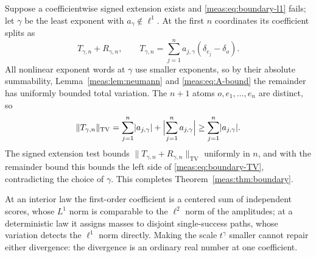 \documentclass[11pt]{article}
\numberwithin{equation}{section}
\theoremstyle{definition}
\theoremstyle{remark}
\newcommand{\TV}{\mathrm{TV}}
\newcommand{\norm}[1]{\lVert#1\rVert}
\newcommand{\abs}[1]{\lvert#1\rvert}
\begin{document}
Suppose a coefficientwise signed extension exists and \eqref{meas:eq:boundary-l1}
fails; let $\gamma$ be the least exponent with $a_\gamma\notin\ell^1$. At the first $n$
coordinates its coefficient splits as
\begin{equation}\label{meas:eq:boundary-first}
 T_{\gamma,n}+R_{\gamma,n},\qquad T_{\gamma,n}=\sum_{j=1}^na_{j,\gamma}(\delta_{e_j}-\delta_o).
\end{equation}
All nonlinear exponent words at $\gamma$ use smaller exponents, so by their absolute
summability, Lemma~\ref{meas:lem:neumann} and \eqref{meas:eq:A-bound} the
remainder has uniformly bounded total variation. The $n+1$ atoms
$o,e_1,\ldots,e_n$ are distinct, so
\begin{equation}\label{meas:eq:boundary-TV}
 \norm{T_{\gamma,n}}_\TV=\sum_{j=1}^n\abs{a_{j,\gamma}}+\Bigl\lvert\sum_{j=1}^na_{j,\gamma}\Bigr\rvert
 \ge\sum_{j=1}^n\abs{a_{j,\gamma}} .
\end{equation}
The signed extension test bounds $\norm{T_{\gamma,n}+R_{\gamma,n}}_\TV$ uniformly in $n$,
and with the remainder bound this bounds the left side of
\eqref{meas:eq:boundary-TV}, contradicting the choice of $\gamma$. This completes
Theorem~\ref{meas:thm:boundary}.

At an interior law the first-order coefficient is a centered sum of independent
scores, whose $L^1$ norm is comparable to the $\ell^2$ norm of the amplitudes; at a
deterministic law it assigns masses to disjoint single-success paths, whose
variation detects the $\ell^1$ norm directly. Making the scale $t^\gamma$ smaller
cannot repair either divergence: the divergence is an ordinary real number at
one coefficient.
\end{document}
